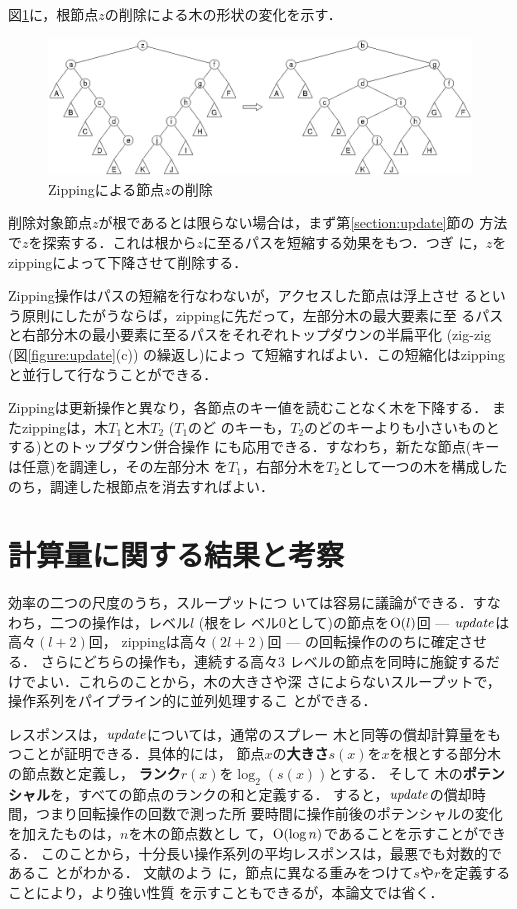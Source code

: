 \documentclass[T]{compsoft}
\begin{document}
図\ref{figure:zipping}に，根節点$z$の削除による木の形状の変化を示す．
\begin{figure}[t]
  \centerline {\includegraphics {images/fig5.eps}}
\caption{Zippingによる節点$z$の削除}
\label{figure:zipping}
\end{figure}

削除対象節点$z$が根であるとは限らない場合は，まず第\ref{section:update}節の
方法で$z$を探索する．これは根から$z$に至るパスを短縮する効果をもつ．つぎ
に，$z$をzippingによって下降させて削除する．

Zipping操作はパスの短縮を行なわないが，アクセスした節点は浮上させ
るという原則にしたがうならば，zippingに先だって，左部分木の最大要素に至
るパスと右部分木の最小要素に至るパスをそれぞれトップダウンの半扁平化
(zig-zig (図\ref{figure:update}(c)) の繰返し)によっ
て短縮すればよい．この短縮化はzippingと並行して行なうことができる．

Zippingは更新操作と異なり，各節点のキー値を読むことなく木を下降する．
またzippingは，木$T_1$と木$T_2$ ($T_1$のど
のキーも，$T_2$のどのキーよりも小さいものとする)とのトップダウン併合操作
にも応用できる．すなわち，新たな節点(キーは任意)を調達し，その左部分木
を$T_1$，右部分木を$T_2$として一つの木を構成した
のち，調達した根節点を消去すればよい．

\section{計算量に関する結果と考察}

効率の二つの尺度のうち，スループットにつ
いては容易に議論ができる．すなわち，二つの操作は，レベル$l$ (根をレ
ベル$0$として)の節点を${\rm O}(l)$回 --- ${\it update\/}$は高々$(l+2)$回，
zippingは高々$(2l+2)$回 ---
の回転操作ののちに確定させる．
さらにどちらの操作も，連続する高々$3$
レベルの節点を同時に施錠するだけでよい．これらのことから，木の大きさや深
さによらないスループットで，操作系列をパイプライン的に並列処理するこ
とができる．

レスポンスは，${\it update\/}$については，通常のスプレー
木と同等の償却計算量をもつことが証明できる．具体的には，
節点$x$の{\bf 大きさ}$s(x)$を$x$を根とする部分木の節点数と定義し，
{\bf ランク}$r(x)$を$\log_2(s(x))$とする．
そして
%
木の{\bf ポテンシャル}を，すべての節点のランクの和と定義する．
すると，${\it update\/}$の償却時間，つまり回転操作の回数で測った所
要時間に操作前後のポテンシャルの変化を加えたものは，$n$を木の節点数とし
て，${\rm O}(\log n)$であることを示すことができる．
このことから，十分長い操作系列の平均レスポンスは，最悪でも対数的であるこ
とがわかる．
文献\Cite{ST85}のよう
に，節点に異なる重みをつけて$s$や$r$を定義することにより，より強い性質
を示すこともできるが，本論文では省く．
\end{document}

